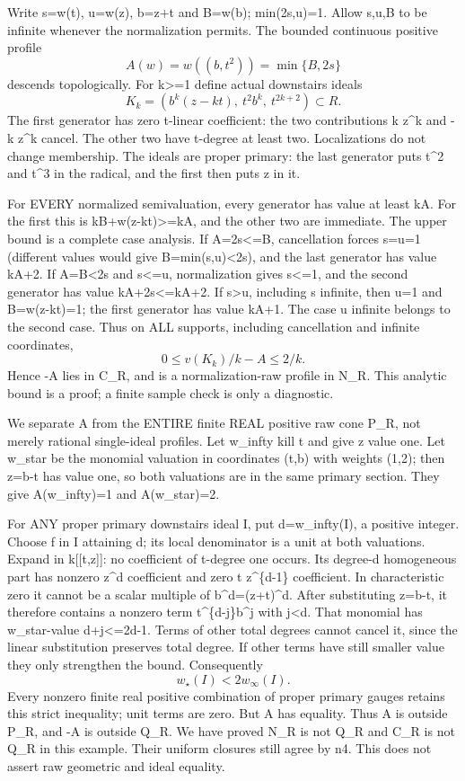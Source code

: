 \documentclass[11pt]{article}
\begin{document}
Write s=w(t), u=w(z), b=z+t and B=w(b); min(2s,u)=1. Allow s,u,B to be infinite whenever the normalization permits. The bounded continuous positive profile
\[
A(w)=w((b,t^2))=\min\{B,2s\}
\]
descends topologically. For k>=1 define actual downstairs ideals
\[
K_k=(b^k(z-kt),\ t^2b^k,\ t^{2k+2})\subset R.
\]
The first generator has zero t-linear coefficient: the two contributions k z\textasciicircum{}k and -k z\textasciicircum{}k cancel. The other two have t-degree at least two. Localizations do not change membership. The ideals are proper primary: the last generator puts t\textasciicircum{}2 and t\textasciicircum{}3 in the radical, and the first then puts z in it.

For EVERY normalized semivaluation, every generator has value at least kA. For the first this is kB+w(z-kt)>=kA, and the other two are immediate. The upper bound is a complete case analysis. If A=2s<=B, cancellation forces s=u=1 (different values would give B=min(s,u)<2s), and the last generator has value kA+2. If A=B<2s and s<=u, normalization gives s<=1, and the second generator has value kA+2s<=kA+2. If s>u, including s infinite, then u=1 and B=w(z-kt)=1; the first generator has value kA+1. The case u infinite belongs to the second case. Thus on ALL supports, including cancellation and infinite coordinates,
\[
0\le v(K_k)/k-A\le2/k.
\]
Hence -A lies in C\_R, and is a normalization-raw profile in N\_R. This analytic bound is a proof; a finite sample check is only a diagnostic.

We separate A from the ENTIRE finite REAL positive raw cone P\_R, not merely rational single-ideal profiles. Let w\_infty kill t and give z value one. Let w\_star be the monomial valuation in coordinates (t,b) with weights (1,2); then z=b-t has value one, so both valuations are in the same primary section. They give A(w\_infty)=1 and A(w\_star)=2.

For ANY proper primary downstairs ideal I, put d=w\_infty(I), a positive integer. Choose f in I attaining d; its local denominator is a unit at both valuations. Expand in k[[t,z]]: no coefficient of t-degree one occurs. Its degree-d homogeneous part has nonzero z\textasciicircum{}d coefficient and zero t z\textasciicircum{}\{d-1\} coefficient. In characteristic zero it cannot be a scalar multiple of b\textasciicircum{}d=(z+t)\textasciicircum{}d. After substituting z=b-t, it therefore contains a nonzero term t\textasciicircum{}\{d-j\}b\textasciicircum{}j with j<d. That monomial has w\_star-value d+j<=2d-1. Terms of other total degrees cannot cancel it, since the linear substitution preserves total degree. If other terms have still smaller value they only strengthen the bound. Consequently
\[
w_\star(I)<2w_\infty(I).
\]
Every nonzero finite real positive combination of proper primary gauges retains this strict inequality; unit terms are zero. But A has equality. Thus A is outside P\_R, and -A is outside Q\_R. We have proved N\_R is not Q\_R and C\_R is not Q\_R in this example. Their uniform closures still agree by n4. This does not assert raw geometric and ideal equality.
\end{document}
